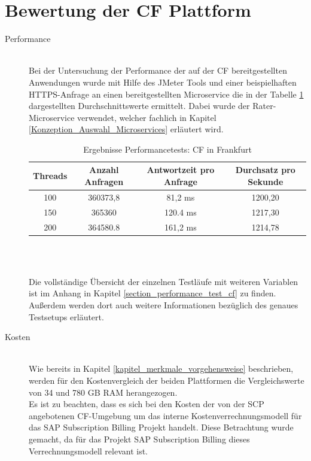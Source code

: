 \section{Bewertung der \acl{CF} Plattform}
\label{bewertung_cf}
\begin{description}
	\item[Performance] \hfill \\
	Bei der Untersuchung der Performance der auf der \ac{CF} bereitgestellten Anwendungen wurde mit Hilfe des JMeter Tools und einer beispielhaften \ac{HTTPS}-Anfrage an einen bereitgestellten Microservice die in der Tabelle \ref{tabelle_ergebnisse_performance_cf} dargestellten Durchschnittswerte ermittelt. Dabei wurde der Rater-Microservice verwendet, welcher fachlich in Kapitel \ref{Konzeption_Auswahl_Microservices} erläutert wird.\\
	\begin{table}[ht]
		\centering
		\begin{tabular}[h]{c|c|c|c}
			Threads & Anzahl Anfragen & Antwortzeit pro Anfrage & Durchsatz pro Sekunde \\
			\hline
			100 & 360373,8 & 81,2 ms & 1200,20
			\\
			\hline
			150 & 365360 & 120.4 ms	& 1217,30
			\\
			\hline
			200 & 364580.8 & 161,2 ms & 1214,78
			\\
		\end{tabular}\\
		\caption{Ergebnisse Performancetests: \acl{CF} in Frankfurt}
		\label{tabelle_ergebnisse_performance_cf}
	\end{table}
	\\
	Die vollständige Übersicht der einzelnen Testläufe mit weiteren Variablen ist im Anhang in Kapitel \ref{section_performance_test_cf} zu finden. Außerdem werden dort auch weitere Informationen bezüglich des genaues Testsetups erläutert.
	\item[Kosten] \hfill \\
	Wie bereits in Kapitel \ref{kapitel_merkmale_vorgehensweise} beschrieben, werden für den Kostenvergleich der beiden Plattformen die Vergleichswerte von 34 und 780 \ac{GB} \ac{RAM} herangezogen.\\
	Es ist zu beachten, dass es sich bei den Kosten der von der \ac{SCP} angebotenen \ac{CF}-Umgebung um das interne Kostenverrechnungsmodell für das SAP Subscription Billing Projekt handelt. Diese Betrachtung wurde gemacht, da für das Projekt SAP Subscription Billing dieses Verrechnungsmodell relevant ist.\\

\end{description}
